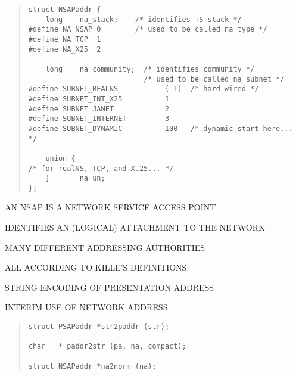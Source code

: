 \begin{bwslide}

\begin{quote}\small\begin{verbatim}
struct NSAPaddr {
    long    na_stack;    /* identifies TS-stack */
#define NA_NSAP 0        /* used to be called na_type */
#define NA_TCP  1
#define NA_X25  2

    long    na_community;  /* identifies community */
                           /* used to be called na_subnet */
#define SUBNET_REALNS           (-1)  /* hard-wired */
#define SUBNET_INT_X25          1       
#define SUBNET_JANET            2
#define SUBNET_INTERNET         3
#define SUBNET_DYNAMIC          100   /* dynamic start here... */

    union {
/* for realNS, TCP, and X.25... */
    }       na_un;
};
\end{verbatim}\end{quote}
\end{bwslide}


\begin{bwslide}

\begin{nrtc}
\item	AN NSAP IS A NETWORK SERVICE ACCESS POINT

\item	IDENTIFIES AN (LOGICAL) ATTACHMENT TO THE NETWORK

\item	MANY DIFFERENT ADDRESSING AUTHORITIES
\end{nrtc}
\end{bwslide}


\begin{bwslide}

\begin{nrtc}
\item	ALL ACCORDING TO KILLE'S DEFINITIONS:
    \begin{nrtc}
    \item	STRING ENCODING OF PRESENTATION ADDRESS

    \item	INTERIM USE OF NETWORK ADDRESS
    \end{nrtc}
\end{nrtc}
\begin{quote}\small\begin{verbatim}
struct PSAPaddr *str2paddr (str);

char   *_paddr2str (pa, na, compact);

struct NSAPaddr *na2norm (na);
\end{verbatim}\end{quote}
\end{bwslide}


